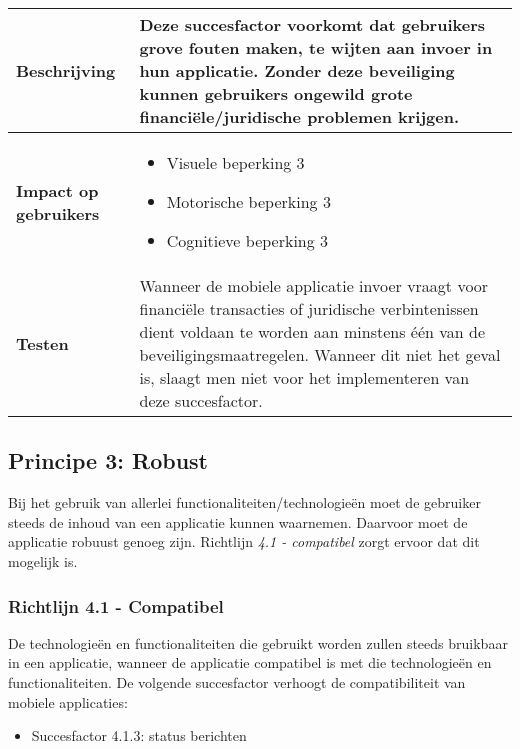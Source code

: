 \begin{table}[H]
\begin{tabular}{|l|p{12cm}|}
        \hline
        \textbf{Beschrijving}                 & Deze succesfactor voorkomt dat gebruikers grove fouten maken, te wijten aan invoer in hun applicatie. Zonder deze beveiliging kunnen gebruikers ongewild grote financiële/juridische problemen krijgen.    \\ 
        \hline
        \textbf{Impact op gebruikers}         &  
        \begin{itemize} 
            \item Visuele beperking 3
            \item Motorische beperking 3
            \item Cognitieve beperking 3
        \end{itemize}                                                                                                                                                                                                                                                                                                     \\ 
        
        \hline
        \textbf{Testen}                       & Wanneer de mobiele applicatie invoer vraagt voor financiële transacties of juridische verbintenissen dient voldaan te worden aan minstens één van de beveiligingsmaatregelen.   Wanneer dit niet het geval is, slaagt men niet voor het implementeren van deze succesfactor.               \\
        \hline
    \end{tabular}
    
\end{table}
\subsection{Principe 3: Robust}
\label{sec:robustWCAG}
Bij het gebruik van allerlei functionaliteiten/technologieën moet de gebruiker steeds de inhoud van een  applicatie kunnen waarnemen. Daarvoor moet de applicatie robuust genoeg zijn. Richtlijn \textit{4.1 - compatibel} zorgt ervoor dat dit mogelijk is.
\subsubsection{Richtlijn 4.1 - Compatibel}
De technologieën en functionaliteiten die gebruikt worden zullen steeds bruikbaar in een applicatie, wanneer de applicatie compatibel is met die technologieën en functionaliteiten. De volgende succesfactor verhoogt de compatibiliteit van mobiele applicaties: \begin{itemize}
 \item Succesfactor 4.1.3: status berichten
\end{itemize}


